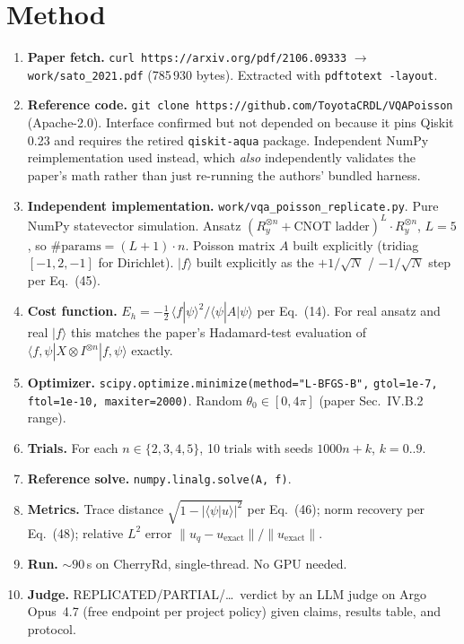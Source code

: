 \documentclass[11pt]{article}
\begin{document}
\section{Method}
\begin{enumerate}
\item \textbf{Paper fetch.} \verb|curl https://arxiv.org/pdf/2106.09333| $\rightarrow$
\verb|work/sato_2021.pdf| (785\,930 bytes). Extracted with \verb|pdftotext -layout|.
\item \textbf{Reference code.} \verb|git clone https://github.com/ToyotaCRDL/VQAPoisson|
(Apache-2.0). Interface confirmed but not depended on because it pins Qiskit 0.23 and
requires the retired \texttt{qiskit-aqua} package. Independent NumPy reimplementation
used instead, which \emph{also} independently validates the paper's math rather than
just re-running the authors' bundled harness.
\item \textbf{Independent implementation.} \verb|work/vqa_poisson_replicate.py|. Pure
NumPy statevector simulation. Ansatz $(R_y^{\otimes n} + \text{CNOT ladder})^L \cdot
R_y^{\otimes n}$, $L=5$, so $\#\text{params} = (L+1)\cdot n$. Poisson matrix $A$
built explicitly (tridiag $[-1, 2, -1]$ for Dirichlet). $|f\rangle$ built explicitly
as the $+1/\sqrt{N}$ / $-1/\sqrt{N}$ step per Eq.~(45).
\item \textbf{Cost function.} $E_h = -\tfrac{1}{2}\,\langle f|\psi\rangle^2 /
\langle\psi|A|\psi\rangle$ per Eq.~(14). For real ansatz and real $|f\rangle$ this
matches the paper's Hadamard-test evaluation of
$\langle f,\psi | X\otimes I^{\otimes n} | f,\psi\rangle$ exactly.
\item \textbf{Optimizer.} \verb|scipy.optimize.minimize(method="L-BFGS-B",|
\verb|gtol=1e-7, ftol=1e-10, maxiter=2000)|. Random $\theta_0\in[0,4\pi]$
(paper Sec.~IV.B.2 range).
\item \textbf{Trials.} For each $n\in\{2,3,4,5\}$, 10 trials with seeds $1000n+k$,
$k=0..9$.
\item \textbf{Reference solve.} \verb|numpy.linalg.solve(A, f)|.
\item \textbf{Metrics.} Trace distance $\sqrt{1-|\langle\psi|\hat u\rangle|^2}$
per Eq.~(46); norm recovery per Eq.~(48); relative $L^2$ error
$\|u_q-u_{\text{exact}}\|/\|u_{\text{exact}}\|$.
\item \textbf{Run.} $\sim\!90$\,s on CherryRd, single-thread. No GPU needed.
\item \textbf{Judge.} REPLICATED/PARTIAL/\ldots\ verdict by an LLM judge on Argo
Opus~4.7 (free endpoint per project policy) given claims, results table, and protocol.
\end{enumerate}
\end{document}
